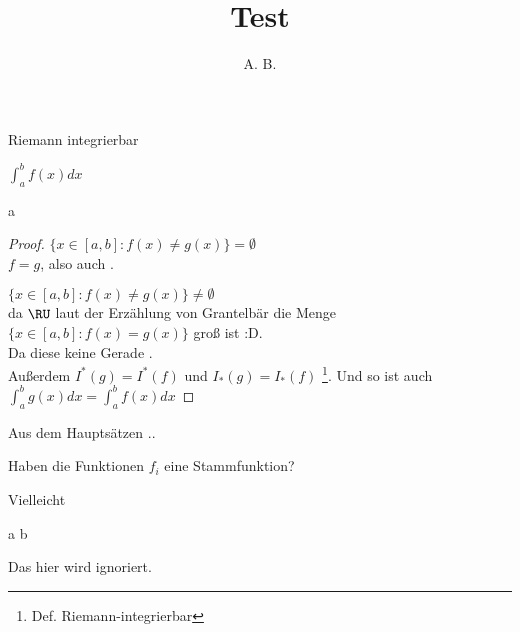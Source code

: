 \documentclass[]{article}
\title{Test}
\author{A. B.}
\begin{document}
\maketitle

\begin{task}
	\begin{task-todo}
		\item Riemann integrierbar
		\item $\int_{a}^{b} f(x) dx$
	\end{task-todo}
	
	\begin{subtask}{a}
		\begin{proof}
			$\{ x \in [a,b]: f(x) \neq g(x) \} = \emptyset $ \\
			\Implies $f = g$, also auch .
			
			$\{ x \in [a,b]: f(x) \neq g(x) \} \neq \emptyset $ \\
			da $\RU$ laut der Erzählung von Grantelbär die Menge 
			$\{ x \in [a,b]: f(x) = g(x) \}$ groß ist :D.\\
			
			Da diese keine Gerade .\\
			
			Außerdem $I^*(g) = I^*(f)$ und $I_*(g) = I_*(f)$ \footnote{Def. Riemann-integrierbar}.
			Und so ist auch $\int_{a}^{b} g(x) dx = \int_{a}^{b} f(x) dx$
		\end{proof}
	\end{subtask}
\end{task}

\begin{task}
	\begin{remark}
		Aus dem Hauptsätzen .. 
	\end{remark}

	\begin{task-todo}
		\item Haben die Funktionen $f_i$ eine Stammfunktion?
	\end{task-todo}

	Vielleicht
	\begin{Eq*}
		a \limplies b
	\end{Eq*}

	\begin{ignore}
		Das hier wird ignoriert.
	\end{ignore}
\end{task}
\end{document}
